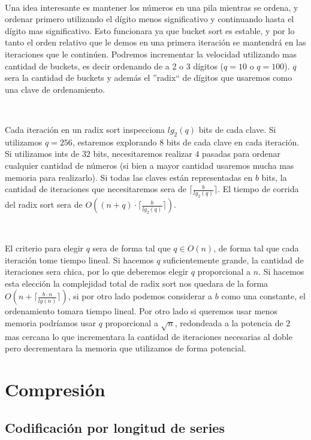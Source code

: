\documentclass[10pt, a4paper]{report}
\begin{document}
~

Una idea interesante es mantener los n\'umeros en una pila mientras se ordena, y ordenar primero utilizando el d\'igito menos significativo y continuando hasta el d\'igito mas significativo. Esto funcionara ya que bucket sort es estable, y por lo tanto el orden relativo que le demos en una primera iteraci\'on se mantendr\'a en las iteraciones que le contin\'uen. Podremos incrementar la velocidad utilizando mas cantidad de buckets, es decir ordenando de a 2 o 3 d\'igitos ($q=10$ o $q=100$). $q$ sera la cantidad de buckets y adem\'as el ''radix`` de d\'igitos que usaremos como una clave de ordenamiento.

~

Cada iteraci\'on en un radix sort inspecciona $lg_2(q)$ bits de cada clave. Si utilizamos $q=256$, estaremos explorando $8$ bits de cada clave en cada iteraci\'on. Si utilizamos ints de $32$ bits, necesitaremos realizar $4$ pasadas para ordenar cualquier cantidad de n\'umeros (si bien a mayor cantidad usaremos mucha mas memoria para realizarlo). Si todas las claves est\'an representadas en $b$ bits, la cantidad de iteraciones que necesitaremos sera de $\lceil \frac{b}{lg_2(q)} \rceil$. El tiempo de corrida del radix sort sera de $O((n+q) \cdot \lceil \frac{b}{lg_2(q)} \rceil)$.

~

El criterio para elegir $q$ sera de forma tal que $q \in O(n)$, de forma tal que cada iteraci\'on tome tiempo lineal. Si hacemos $q$ suficientemente grande, la cantidad de iteraciones sera chica, por lo que deberemos elegir $q$ proporcional a $n$. Si hacemos esta elecci\'on la complejidad total de radix sort nos quedara de la forma $O(n + \lceil \frac{b \cdot n}{lg(n)} \rceil)$, si por otro lado podemos considerar a $b$ como una constante, el ordenamiento tomara tiempo lineal. Por otro lado si queremos usar menos memoria podr\'iamos usar $q$ proporcional a $\sqrt{n}$, redondeada a la potencia de $2$ mas cercana lo que incrementara la cantidad de iteraciones necesarias al doble pero decrementara la memoria que utilizamos de forma potencial.

\newpage
\section{Compresi\'on}
\subsection{Codificaci\'on por longitud de series}
\end{document}

